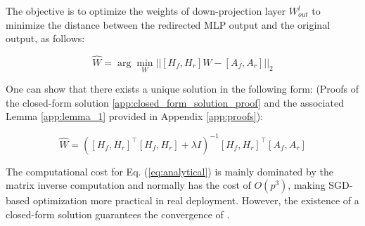 

The objective is to optimize the weights of down-projection layer $W^{l}_{out}$ to minimize the distance between the redirected MLP output and the original output, as follows:

\vspace{-0.4cm}
\begin{equation} \label{eq:optimization_problem1}
    \widehat{W} = \arg \min_{W} ||[H_f, H_r] W - [A_f,A_r]||_{2}
\end{equation}
\vspace{-0.5cm}

One can show that there exists a unique solution in the following form: (Proofs of the closed-form solution \ref{app:closed_form_solution_proof} and the associated Lemma \ref{app:lemma_1} provided in Appendix \ref{app:proofs}):

\vspace{-0.6cm}
\begin{equation} \label{eq:analytical}
    \widehat{W} = ([H_f, H_r]^\top [H_f, H_r] + \lambda I)^{-1}[H_f, H_r]^\top [A_f, A_r]
\end{equation}
\vspace{-0.4cm}

The computational cost for Eq. (\ref{eq:analytical}) is mainly dominated by the matrix inverse computation and normally has the cost of \( O(p^3) \), making SGD-based optimization more practical in real deployment. However, the existence of a closed-form solution guarantees the convergence of \lunar.



